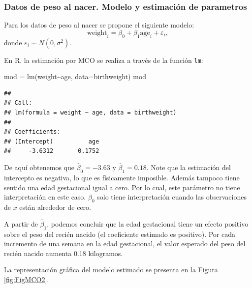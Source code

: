 \documentclass[
]{article}
\newenvironment{Shaded}{\begin{snugshade}}{\end{snugshade}}
\newcommand{\AttributeTok}[1]{\textcolor[rgb]{0.77,0.63,0.00}{#1}}
\newcommand{\FunctionTok}[1]{\textcolor[rgb]{0.00,0.00,0.00}{#1}}
\newcommand{\NormalTok}[1]{#1}
\newcommand{\OtherTok}[1]{\textcolor[rgb]{0.56,0.35,0.01}{#1}}
\newcommand{\SpecialCharTok}[1]{\textcolor[rgb]{0.00,0.00,0.00}{#1}}
\begin{document}
\hypertarget{datos-de-peso-al-nacer.-modelo-y-estimaciuxf3n-de-parametros}{%
\subsubsection*{Datos de peso al nacer. Modelo y estimación de parametros}\label{datos-de-peso-al-nacer.-modelo-y-estimaciuxf3n-de-parametros}}

Para los datos de peso al nacer se propone el siguiente modelo:
\begin{equation}
\mbox{weight}_{i}= \beta_{0} + \beta_{1}\mbox{age}_{i} + \varepsilon_{i},
\label{eq:modBirthweight}
\end{equation}
donde \(\varepsilon_{i} \sim N(0,\sigma^{2})\).

En R, la estimación por MCO se realiza a través de la función \texttt{lm}:

\begin{Shaded}
\begin{Highlighting}[]
\NormalTok{mod }\OtherTok{=} \FunctionTok{lm}\NormalTok{(weight}\SpecialCharTok{\textasciitilde{}}\NormalTok{age, }\AttributeTok{data=}\NormalTok{birthweight)}
\NormalTok{mod}
\end{Highlighting}
\end{Shaded}

\begin{verbatim}
## 
## Call:
## lm(formula = weight ~ age, data = birthweight)
## 
## Coefficients:
## (Intercept)          age  
##     -3.6312       0.1752
\end{verbatim}

De aquí obtenemos que \(\widehat{\beta}_{0} =-3.63\) y \(\widehat{\beta}_{1} =0.18\). Note que la estimación del intercepto es negativa, lo que es físicamente imposible. Además tampoco tiene sentido una edad gestacional igual a cero. Por lo cual, este parámetro no tiene interpretación en este caso. \(\beta_{0}\) solo tiene interpretación cuando las observaciones de \(x\) están alrededor de cero.

A partir de \(\widehat{\beta}_{1}\), podemos concluir que la edad gestacional tiene un efecto positivo sobre el peso del recién nacido (el coeficiente estimado es positivo). Por cada incremento de una semana en la edad gestacional, el valor esperado del peso del recién nacido aumenta 0.18 kilogramos.

La representación gráfica del modelo estimado se presenta en la Figura \ref{fig:FigMCO2}.
\end{document}
